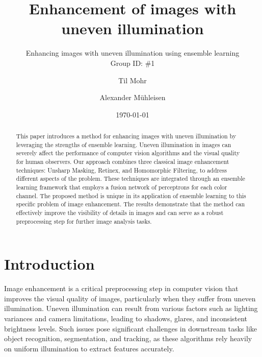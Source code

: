 \documentclass[sigconf]{acmart}
\begin{document}
\title{Enhancement of images with uneven illumination}
\subtitle{Enhancing images with uneven illumination using ensemble learning\\Group ID: \#1}

\author{Til Mohr}
\affiliation{}

\author{Alexander Mühleisen}
\affiliation{}

\date{\today}



\begin{abstract}
This paper introduces a method for enhancing images with uneven illumination by leveraging the strengths of ensemble learning. Uneven illumination in images can severely affect the performance of computer vision algorithms and the visual quality for human observers. Our approach combines three classical image enhancement techniques: Unsharp Masking, Retinex, and Homomorphic Filtering, to address different aspects of the problem. These techniques are integrated through an ensemble learning framework that employs a fusion network of perceptrons for each color channel. The proposed method is unique in its application of ensemble learning to this specific problem of image enhancement. The results demonstrate that the method can effectively improve the visibility of details in images and can serve as a robust preprocessing step for further image analysis tasks.
\end{abstract}


\renewcommand\footnotetextcopyrightpermission[1]{}
\pagestyle{plain}

\maketitle


\section{Introduction}\label{sec:intro}
Image enhancement is a critical preprocessing step in computer vision that improves the visual quality of images, particularly when they suffer from uneven illumination. Uneven illumination can result from various factors such as lighting variances and camera limitations, leading to shadows, glares, and inconsistent brightness levels. Such issues pose significant challenges in downstream tasks like object recognition, segmentation, and tracking, as these algorithms rely heavily on uniform illumination to extract features accurately.
\end{document}
